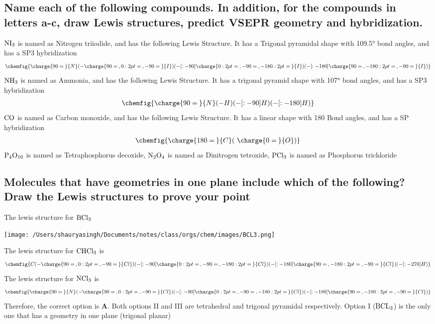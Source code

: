\documentclass[11pt]{article}
\begin{document}
\subsection{Name each of the following compounds. In addition, for the compounds in letters a-c, draw Lewis structures, predict VSEPR geometry and hybridization.}
\label{sec:org90e66ff}
\(\ce{NI3}\) is named as Nitrogen triiodide, and has the following Lewis Structure. It has a Trigonal pyramidal shape with 109.5° bond angles, and has a SP3 hybridization
\begin{align}
\chemfig{\charge{90=\:}{N}(-\charge{90=\:, 0:2pt=\:, -90=\:}{I})(-[:-90]\charge{0:2pt=\:, -90=\:, -180:2pt=\:}{I})(-[:-180]\charge{90=\:, -180:2pt=\:, -90=\:}{I})}
\end{align}
\(\ce{NH3}\) is named as Ammonia, and has the following Lewis Structure. It has a trigonal pyramid shape with 107° bond angles, and has a SP3 hybridization
\begin{align}
\chemfig{\charge{90=\:}{N}(-{H})(-[:-90]{H})(-[:-180]{H})}
\end{align}
\(\ce{CO}\) is named as Carbon monoxide, and has the following Lewis Structure. It has a linear shape with 180\textdegree{} Bond angles, and has a SP hybridization
\begin{align}
\chemfig{\charge{180=\:}{C}(~\charge{0=\:}{O})}
\end{align}
\(\ce{P4O10}\) is named as Tetraphosphorus decoxide,
\(\ce{N2O4}\) is named as Dinitrogen tetroxide,
\(\ce{PCl3}\) is named as Phosphorus trichloride

\subsection{Molecules that have geometries in one plane include which of the following? Draw the Lewis structures to prove your point}
\label{sec:orgca627a0}
The lewis structure for \(\ce{BCl3}\)
\begin{center}
\texttt{[image: /Users/shauryasingh/Documents/notes/class/orgs/chem/images/BCL3.png]}
\end{center}
The lewis structure for \(\ce{CHCl3}\) is
\begin{align}
\chemfig{{C}(-\charge{90=\:, 0:2pt=\:, -90=\:}{Cl})(-[:-90]\charge{0:2pt=\:, -90=\:, -180:2pt=\:}{Cl})(-[:-180]\charge{90=\:, -180:2pt=\:, -90=\:}{Cl})(-[:-270]{H})}
\end{align}
The lewis structure for \(\ce{NCl3}\) is
\begin{align}
\chemfig{\charge{90=\:}{N}(-\charge{90=\:, 0:2pt=\:, -90=\:}{Cl})(-[:-90]\charge{0:2pt=\:, -90=\:, -180:2pt=\:}{Cl})(-[:-180]\charge{90=\:, -180:2pt=\:, -90=\:}{Cl})}
\end{align}
Therefore, the correct option is \textbf{A}. Both options II and III are tetrahedral and trigonal pyramidal respectively. Option I (\(\ce{BCL3}\)) is the only one that has a geometry in one plane (trigonal planar)
\end{document}
